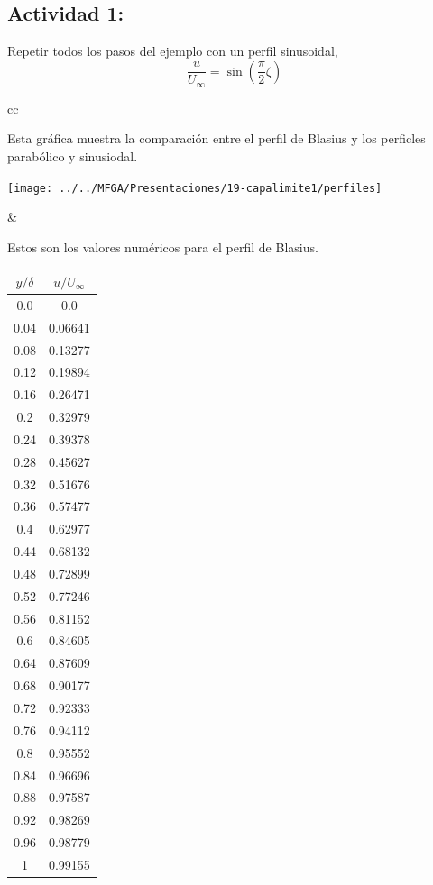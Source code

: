 	
	\subsection*{Actividad 1:}
		Repetir todos los pasos del ejemplo con un perfil sinusoidal, 
		\[
		\frac{u}{U_{\infty}}=\sin\left(\frac{\pi}{2}\zeta\right)
		\]

	
	
	\begin{tabular}{cc}
		\begin{minipage}[c]{0.75\textwidth}%
			Esta gráfica muestra la comparación entre el perfil de Blasius y los perficles parabólico y sinusiodal.
			\begin{center}
				\texttt{[image: ../../MFGA/Presentaciones/19-capalimite1/perfiles]}
			\end{center}
			
			\begin{flushleft}
				\par\end{flushleft}%
		\end{minipage} & %
		\begin{minipage}[c]{0.25\textwidth}%
			Estos son los valores numéricos para el perfil de Blasius.
				\begin{center}
					\begin{tabular}{|c|c|}
						\hline 
						$y/\delta$  & $u/U_{\infty}$ \tabularnewline
						\hline 
						\hline 
						0.0  & 0.0 \tabularnewline
						\hline 
						0.04  & 0.06641 \tabularnewline
						\hline 
						0.08  & 0.13277 \tabularnewline
						\hline 
						0.12  & 0.19894 \tabularnewline
						\hline 
						0.16  & 0.26471 \tabularnewline
						\hline 
						0.2  & 0.32979 \tabularnewline
						\hline 
						0.24  & 0.39378 \tabularnewline
						\hline 
						0.28  & 0.45627 \tabularnewline
						\hline 
						0.32  & 0.51676 \tabularnewline
						\hline 
						0.36  & 0.57477 \tabularnewline
						\hline 
						0.4  & 0.62977 \tabularnewline
						\hline 
						0.44  & 0.68132 \tabularnewline
						\hline 
						0.48  & 0.72899 \tabularnewline
						\hline 
						0.52  & 0.77246 \tabularnewline
						\hline 
						0.56  & 0.81152 \tabularnewline
						\hline 
						0.6  & 0.84605 \tabularnewline
						\hline 
						0.64  & 0.87609 \tabularnewline
						\hline 
						0.68  & 0.90177 \tabularnewline
						\hline 
						0.72  & 0.92333 \tabularnewline
						\hline 
						0.76  & 0.94112 \tabularnewline
						\hline 
						0.8  & 0.95552 \tabularnewline
						\hline 
						0.84  & 0.96696 \tabularnewline
						\hline 
						0.88  & 0.97587 \tabularnewline
						\hline 
						0.92  & 0.98269 \tabularnewline
						\hline 
						0.96  & 0.98779 \tabularnewline
						\hline 
						1  & 0.99155 \tabularnewline
						\hline 
					\end{tabular}
					\par\end{center}
		\end{minipage}\tabularnewline
	\end{tabular}

